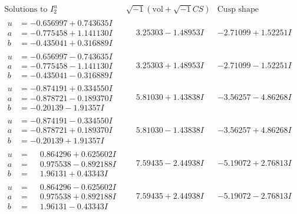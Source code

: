 \documentclass[1p]{elsarticle_modified}
\theoremstyle{definition}
\newcommand{\I}{\sqrt{-1}}
\begin{document}
$$\begin{array}{c|c|c}  
\text{Solutions to }I^u_{2}& \I (\text{vol} + \sqrt{-1}CS) & \text{Cusp shape}\\
 \hline 
\begin{aligned}
u &= -0.656997 + 0.743635 I \\
a &= -0.775458 + 1.141130 I \\
b &= -0.435041 + 0.316889 I\end{aligned}
 & \phantom{-}3.25303 - 1.48953 I & -2.71099 + 1.52251 I \\ \hline\begin{aligned}
u &= -0.656997 - 0.743635 I \\
a &= -0.775458 - 1.141130 I \\
b &= -0.435041 - 0.316889 I\end{aligned}
 & \phantom{-}3.25303 + 1.48953 I & -2.71099 - 1.52251 I \\ \hline\begin{aligned}
u &= -0.874191 + 0.334550 I \\
a &= -0.878721 - 0.189370 I \\
b &= -0.20139 - 1.91357 I\end{aligned}
 & \phantom{-}5.81030 + 1.43838 I & -3.56257 - 4.86268 I \\ \hline\begin{aligned}
u &= -0.874191 - 0.334550 I \\
a &= -0.878721 + 0.189370 I \\
b &= -0.20139 + 1.91357 I\end{aligned}
 & \phantom{-}5.81030 - 1.43838 I & -3.56257 + 4.86268 I \\ \hline\begin{aligned}
u &= \phantom{-}0.864296 + 0.625602 I \\
a &= \phantom{-}0.975538 - 0.892188 I \\
b &= \phantom{-}1.96131 + 0.43343 I\end{aligned}
 & \phantom{-}7.59435 - 2.44938 I & -5.19072 + 2.76813 I \\ \hline\begin{aligned}
u &= \phantom{-}0.864296 - 0.625602 I \\
a &= \phantom{-}0.975538 + 0.892188 I \\
b &= \phantom{-}1.96131 - 0.43343 I\end{aligned}
 & \phantom{-}7.59435 + 2.44938 I & -5.19072 - 2.76813 I \\ \hline\begin{aligned}

\end{aligned}
\end{array}$$
\end{document}
